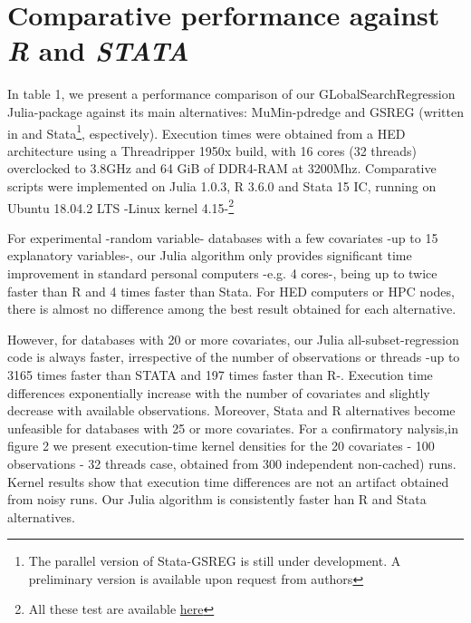 \documentclass{juliacon}
\begin{document}


\section{Comparative performance against \textit{R} and \textit{STATA}}
\label{sec:comparativeperf}

In table 1, we present a performance comparison of our GLobalSearchRegression Julia-package against its main alternatives: MuMin-pdredge and GSREG (written in  and Stata\footnote{The parallel version of Stata-GSREG is still under development. A preliminary version is available upon request from authors}, espectively).
Execution times were obtained from a HED architecture using a Threadripper 1950x build, with 16 cores (32 threads) overclocked to 3.8GHz and 64 GiB of DDR4-RAM at 3200Mhz. Comparative scripts were implemented on Julia 1.0.3, R 3.6.0 and Stata 15 IC, running on Ubuntu 18.04.2 LTS -Linux kernel 4.15-\footnote{All these test are available \href{https://github.com/ParallelGSReg/GlobalSearchRegression.jl/tree/master/juliacon2019proceedings/reproducibility}{here}} \vskip 6pt

For experimental -random variable- databases with a few covariates -up to 15 explanatory variables-, our Julia algorithm only provides significant time improvement in standard personal computers -e.g. 4 cores-, being up to twice faster than R and 4 times faster than Stata. For HED computers or HPC nodes, there is almost no difference among the best result obtained for each alternative. \vskip 6pt

However, for databases with 20 or more covariates, our Julia all-subset-regression code is always faster, irrespective of the number of observations or threads -up to 3165 times faster than STATA and 197 times faster than R-. Execution time differences exponentially increase with the number of covariates and slightly decrease with available observations. Moreover, Stata and R alternatives become unfeasible for databases with 25 or more covariates. For a confirmatory nalysis,in figure 2 we present execution-time kernel densities for the 20 covariates - 100 observations - 32 threads case, obtained from 300 independent non-cached) runs. Kernel results show that execution time differences are not an artifact obtained from noisy runs. Our Julia algorithm is consistently faster han R and Stata alternatives. \vskip 6pt
\end{document}
